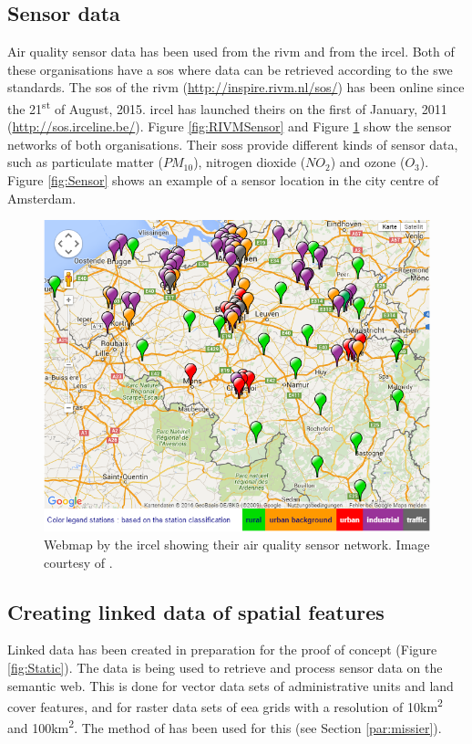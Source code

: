 \subsection{Sensor data}
\label{sensor}
\begin{sloppypar}
Air quality sensor data has been used from the \acf{rivm} and from the \acf{ircel}. Both of these organisations have a \ac{sos} where data can be retrieved according to the \ac{swe} standards. The \ac{sos} of the \ac{rivm} (\url{http://inspire.rivm.nl/sos/}) has been online since the 21\textsuperscript{st} of August, 2015. \ac{ircel} has launched theirs on the first of January, 2011 (\url{http://sos.irceline.be/}). Figure \ref{fig:RIVMSensor} and Figure \ref{fig:IRCELINESensor} show the sensor networks of both organisations. Their \aclp{sos} provide different kinds of sensor data, such as particulate matter ($PM_{10}$), nitrogen dioxide ($NO_{2}$) and ozone ($O_{3}$). Figure \ref{fig:Sensor} shows an example of a sensor location in the city centre of Amsterdam. 
\end{sloppypar}


\begin{figure}
	\centering
	\includegraphics[width=0.8\linewidth]{figs/IRCELINESensors.png}
	\caption{Webmap by the \acf*{ircel} showing their air quality sensor network. Image courtesy of \cite{DATA:IRCEL}.}
	\label{fig:IRCELINESensor}
\end{figure}

\subsection{Creating linked data of spatial features}
\label{linked}
Linked data has been created in preparation for the proof of concept (Figure \ref{fig:Static}). The data is being used to retrieve and process sensor data on the semantic web. This is done for vector data sets of administrative units and land cover features, and for raster data sets of \ac{eea} grids with a resolution of 10km\textsuperscript{2} and 100km\textsuperscript{2}. The method of \cite{LD:Missier} has been used for this (see Section \ref{par:missier}).


